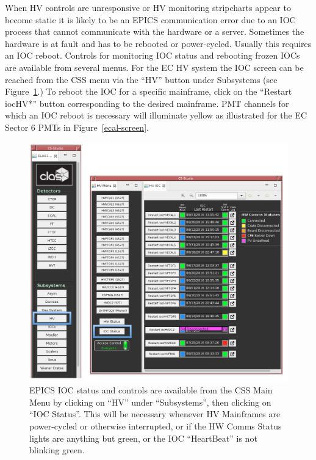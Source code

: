 \documentclass[letterpaper,10pt]{article}
\begin{document}
When HV controls are unresponsive or HV monitoring stripcharts appear to become static it is likely
to be an EPICS communication error due to an IOC process that cannot communicate with the hardware or a
server.  Sometimes the hardware is at fault and has to be rebooted or power-cycled.  Usually this
requires an IOC reboot.  Controls for monitoring IOC status and rebooting frozen IOCs are available from
several menus.  For the EC HV system the IOC screen can be reached from the CSS menu via the ``HV''
button under Subsystems (see Figure~\ref{ecal-screen4}.)  To reboot the
IOC for a specific mainframe, click on the ``Restart iocHV*'' button corresponding to the desired mainframe.
PMT channels for which an IOC reboot is necessary will illuminate yellow as illustrated for the EC Sector 6 PMTs
in Figure~\ref{ecal-screen}.

\begin{figure}[htbp]
  \centering
  \includegraphics[width= 6in, keepaspectratio = true]{HV_IOC_2}
  \vspace{2mm}
  \caption{EPICS IOC status and controls are available from the CSS Main Menu by clicking on ``HV'' under ``Subsystems'',
    then clicking on ``IOC Status''.  This will be necessary whenever HV Mainframes are power-cycled or otherwise
  interrupted, or if the HW Comms Status lights are anything but green, or the IOC ``HeartBeat'' is not blinking green.}
  \label{ecal-screen4}
\end{figure}
\end{document}
